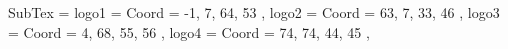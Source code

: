 SubTex = {
	logo1								= { Coord = { -1, 7, 64, 53 } },
	logo2								= { Coord = { 63, 7, 33, 46 } },
	logo3								= { Coord = { 4, 68, 55, 56 } },
	logo4								= { Coord = { 74, 74, 44, 45 } },
}

